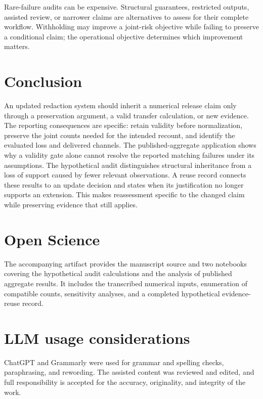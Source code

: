 \documentclass[conference]{IEEEtran}
\begin{document}
Rare-failure audits can be expensive. Structural guarantees, restricted outputs, assisted review, or narrower claims are alternatives to assess for their complete workflow. Withholding may improve a joint-risk objective while failing to preserve a conditional claim; the operational objective determines which improvement matters.

\section{Conclusion}
An updated redaction system should inherit a numerical release claim only through a preservation argument, a valid transfer calculation, or new evidence. The reporting consequences are specific: retain validity before normalization, preserve the joint counts needed for the intended recount, and identify the evaluated loss and delivered channels. The published-aggregate application shows why a validity gate alone cannot resolve the reported matching failures under its assumptions. The hypothetical audit distinguishes structural inheritance from a loss of support caused by fewer relevant observations. A reuse record connects these results to an update decision and states when its justification no longer supports an extension. This makes reassessment specific to the changed claim while preserving evidence that still applies.

\clearpage
\section*{Open Science}
The accompanying artifact provides the manuscript source and two notebooks covering the hypothetical audit calculations and the analysis of published aggregate results. It includes the transcribed numerical inputs, enumeration of compatible counts, sensitivity analyses, and a completed hypothetical evidence-reuse record.

\section*{LLM usage considerations}
ChatGPT and Grammarly were used for grammar and spelling checks, paraphrasing, and rewording. The assisted content was reviewed and edited, and full responsibility is accepted for the accuracy, originality, and integrity of the work.




\end{document}
